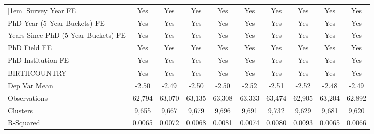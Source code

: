 \begin{table}[htbp]
\begin{tabular}{l*{9}{c}}
[1em]
Survey Year FE&         Yes         &         Yes         &         Yes         &         Yes         &         Yes         &         Yes         &         Yes         &         Yes         &         Yes         \\
[1em]
PhD Year (5-Year Buckets) FE&         Yes         &         Yes         &         Yes         &         Yes         &         Yes         &         Yes         &         Yes         &         Yes         &         Yes         \\
[1em]
Years Since PhD (5-Year Buckets) FE&         Yes         &         Yes         &         Yes         &         Yes         &         Yes         &         Yes         &         Yes         &         Yes         &         Yes         \\
[1em]
PhD Field FE&         Yes         &         Yes         &         Yes         &         Yes         &         Yes         &         Yes         &         Yes         &         Yes         &         Yes         \\
[1em]
PhD Institution FE&         Yes         &         Yes         &         Yes         &         Yes         &         Yes         &         Yes         &         Yes         &         Yes         &         Yes         \\
[1em]
BIRTHCOUNTRY&         Yes         &         Yes         &         Yes         &         Yes         &         Yes         &         Yes         &         Yes         &         Yes         &         Yes         \\
\hline
Dep Var Mean&       -2.50         &       -2.49         &       -2.50         &       -2.50         &       -2.52         &       -2.51         &       -2.52         &       -2.48         &       -2.49         \\
Observations&      62,794         &      63,070         &      63,135         &      63,308         &      63,333         &      63,474         &      62,905         &      63,204         &      62,892         \\
Clusters&       9,655         &       9,667         &       9,679         &       9,696         &       9,691         &       9,732         &       9,629         &       9,681         &       9,620         \\
R-Squared&      0.0065         &      0.0072         &      0.0068         &      0.0081         &      0.0074         &      0.0080         &      0.0093         &      0.0065         &      0.0066         \\

\end{tabular}
\end{table}
